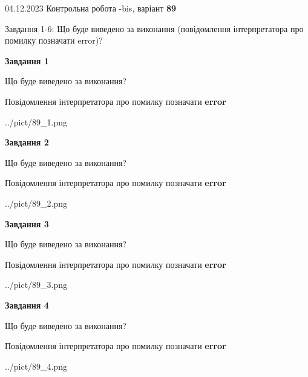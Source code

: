 \documentclass[12pt, ukrainian]{article}
\begin{document}
{{04.12.2023 Контрольна робота -bis, варіант  \No \textbf { 89 }\par}}
{

Завдання 1-6: Що буде виведено за виконання (повідомлення інтерпретатора про помилку позначати error)?


{\begin {center}\textbf{Завдання 1}\end {center}}\par
Що буде виведено за виконання? \par
Повідомлення інтерпретатора про помилку позначати \textbf{error}

\begin{center}
	{../pict/89_1.png}
\end{center}
\newpage

{\begin {center}\textbf{Завдання 2}\end {center}}\par
Що буде виведено за виконання? \par
Повідомлення інтерпретатора про помилку позначати \textbf{error}

\begin{center}
	{../pict/89_2.png}
\end{center}
\newpage

{\begin {center}\textbf{Завдання 3}\end {center}}\par
Що буде виведено за виконання? \par
Повідомлення інтерпретатора про помилку позначати \textbf{error}

\begin{center}
	{../pict/89_3.png}
\end{center}
\newpage

{\begin {center}\textbf{Завдання 4}\end {center}}\par
Що буде виведено за виконання? \par
Повідомлення інтерпретатора про помилку позначати \textbf{error}

\begin{center}
	{../pict/89_4.png}
\end{center}
\newpage

}
\end{document}
